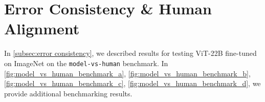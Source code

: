 \documentclass{article}
\begin{document}
\begin{table}[t]
    \caption{Evaluation on some representative metrics from the Plex reliability benchmark~\citep{tran2022plex}.}
\centering
  \setlength{\tabcolsep}{4pt}
    \label{tab:full_plex}
\end{table}
 \section{Error Consistency \& Human Alignment}
In \cref{subsec:error consistency}, we described results for testing ViT-22B fine-tuned on ImageNet on the \texttt{model-vs-human} benchmark. In \cref{fig:model_vs_human_benchmark_a}, \cref{fig:model_vs_human_benchmark_b}, \cref{fig:model_vs_human_benchmark_c}, \cref{fig:model_vs_human_benchmark_d}, we provide additional benchmarking results.
\end{document}
